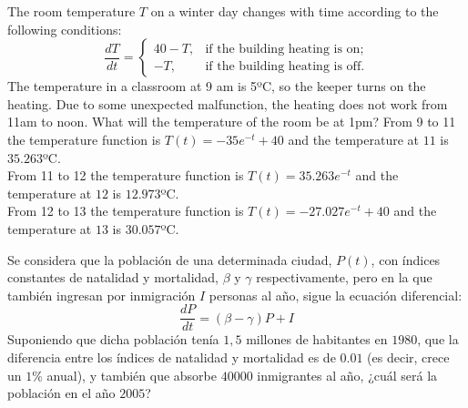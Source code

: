 {The room temperature $T$ on a winter day changes with time according to the following conditions:
\[
\frac{dT}{dt}=
\begin{cases}
40-T, & \mbox{if the building heating is on;} \\
-T, & \mbox{if the building heating is off.}
\end{cases}
\]
The temperature in a classroom at 9 am is 5ºC, so the keeper turns on the heating.
Due to some unexpected malfunction, the heating does not work from 11am to noon.
What will the temperature of the room be at 1pm?
}
{From 9 to 11 the temperature function is $T(t)=-35e^{-t}+40$ and the temperature at $11$ is $35.263$ºC.\\
From 11 to 12 the temperature function is $T(t)=35.263e^{-t}$ and the temperature at $12$ is $12.973$ºC.\\
From 12 to 13 the temperature function is $T(t)=-27.027e^{-t}+40$ and the temperature at $13$ is $30.057$ºC.
}
{}


{Se considera que la población de una determinada ciudad, $P(t)$, con índices constantes de natalidad y mortalidad,
$\beta$ y $\gamma$ respectivamente, pero en la que también ingresan por inmigración $I$ personas al año, sigue la
ecuación diferencial:
\[
\frac{{dP}} {{dt}} = \left( {\beta  - \gamma } \right)P + I
\]
Suponiendo que dicha población tenía $1,5$ millones de habitantes en $1980$, que la diferencia entre los índices de
natalidad y mortalidad es de $0.01$ (es decir, crece un $1\%$ anual), y también que absorbe $40000$ inmigrantes al año,
¿cuál será la población en el año $2005$?}
{
}
{}


